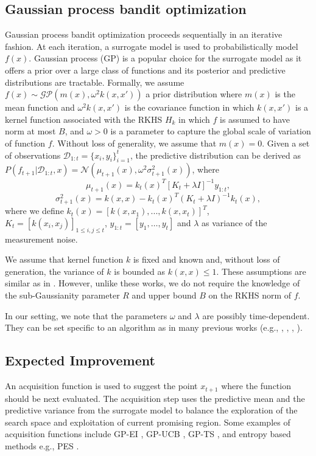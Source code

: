 \documentclass[twoside]{article}
\begin{document}
\subsection{Gaussian process bandit optimization}
Gaussian process bandit optimization proceeds sequentially in an iterative fashion. At each iteration, a surrogate model is used to probabilistically model $f(x)$. Gaussian process (GP) \citep{Rasmussen05} is a popular choice for the surrogate model as it offers a prior over a large class of functions and its posterior and predictive distributions are tractable. Formally, we assume $f(x) \sim \mathcal {GP}(m(x), \omega^2 k(x, x'))$ a prior distribution where $m(x)$ is the mean function and $\omega^2 k(x, x')$ is the covariance function in which $k(x, x')$ is a kernel function associated with the RKHS $H_k$ in which $f$ is assumed to have norm at
most $B$, and $\omega > 0$ is a parameter to capture the global scale of variation of function $f$. Without loss of generality, we assume that $m(x) = 0$. Given a set of observations $\mathcal D_{1:t} = \{x_i, y_i\}_{i=1}^t$, the predictive distribution can be derived as $P(f_{t+1}| \mathcal D_{1:t}, x) = \mathcal N(\mu_{t+1}(x), \omega^2\sigma_{t+1}^2(x))$, where $$\mu_{t+1}(x) = k_t(x)^T[K_t + \lambda I]^{-1}y_{1:t},$$
$$\sigma_{t+1}^2(x) = k(x,x) - k_t(x)^{T}(K_t + \lambda I)^{-1}k_t(x),$$
where we define $k_t(x)= [k(x, x_1), ..., k(x, x_t)]^T$, $K_t= [k(x_i, x_j)]_{1 \le i,j \le t}$,  $y_{1:t}=[y_1,\ldots,y_t]$ and $\lambda$ as variance of the measurement noise.

We assume that kernel function $k$ is fixed and known and, without loss of generation, the variance of $k$ is bounded as $k(x,x) \le 1$. These assumptions are similar as in \citep{Srinivas12,Chowdhury17,janz20a}. However, unlike these works, we do not require the knowledge of the sub-Gaussianity parameter $R$ and upper bound $B$ on the RKHS norm of $f$.

In our setting, we note that the parameters $\omega$ and $\lambda$ are possibly time-dependent. They can be set specific to an algorithm as in many previous works (e.g., \citep{Bull11}, \citep{agrawal13}, \citep{wang2014}, \citep{Chowdhury17}).
\subsection{Expected Improvement}
An acquisition function is used to suggest the point $x_{t+1}$ where the function should be next evaluated. The acquisition step uses the predictive mean and the predictive variance from the surrogate model to balance the exploration of the search space and exploitation of current promising region. Some examples of acquisition functions include GP-EI \citep{Bull11}, GP-UCB \citep{Srinivas12}, GP-TS \citep{Chowdhury17}, and entropy based methods e.g., PES \citep{Lobato14}.
\end{document}
